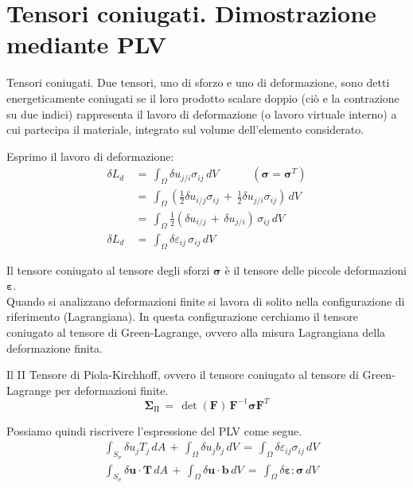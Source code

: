 \section{Tensori coniugati. Dimostrazione mediante PLV}

\begin{definizioneBox}
Tensori coniugati. Due tensori, uno di sforzo e uno di deformazione, sono detti energeticamente coniugati
se il loro prodotto scalare doppio (ciò e la contrazione su due indici) rappresenta il lavoro di
deformazione (o lavoro virtuale interno) a cui partecipa il materiale, integrato sul volume
dell'elemento considerato.
\end{definizioneBox}
Esprimo  il lavoro di deformazione:
\begin{align*}
    \delta L_d \, &=\,  \int_{\Omega} \delta u_{j/i}  \sigma_{ij}  \, dV  
      \quad\quad\quad \left( \boldsymbol{\sigma} = \boldsymbol{\sigma}^T \right)\\
    &= \,  \int_{\Omega}  \left( \frac{1}{2} \delta u_{i/j}  \sigma_{ij} \, + \,        \frac{1}{2} \delta u_{j/i}  \sigma_{ij} \right) \, dV  \\
    &=  \,  \int_{\Omega}  \frac{1}{2} \left( \delta u_{i/j}  \, + \,       \delta u_{j/i}  \right)\,\sigma_{ij}  \, dV  \\
     \delta L_d \, &= \,  \int_{\Omega}  \delta \varepsilon_{ij}  \,\sigma_{ij}  \, dV 
\end{align*}

Il tensore coniugato al tensore degli sforzi $\boldsymbol{\sigma}$ è il tensore delle piccole deformazioni $\boldsymbol{\varepsilon}$.\\

Quando si analizzano deformazioni finite si lavora di solito nella configurazione di riferimento (Lagrangiana). In questa configurazione cerchiamo il tensore coniugato al tensore di Green-Lagrange, ovvero alla misura Lagrangiana della deformazione finita. 

\begin{definizioneBox}
    Il II Tensore di Piola-Kirchhoff, ovvero il tensore coniugato al tensore di Green-Lagrange per deformazioni finite.
    \begin{equation*}
        \boldsymbol{\Sigma}_{\mathrm{II}} \,= \, \det (\boldsymbol{F} )\, \boldsymbol{F}^{-1} \boldsymbol{\sigma} \boldsymbol{F}^T
    \end{equation*}
\end{definizioneBox}

Possiamo quindi riscrivere l'espressione del PLV come segue.
\begin{align*}
     & \int_{S_{\sigma}}  \delta u_j T_j \, dA  \, +\,\int_{\Omega} \delta u_{j}  b_j  \, dV \, = \, \int_{\Omega} \delta \varepsilon_{ij}  \sigma_{ij}  \, dV   \\
    &  \int_{S_{\sigma}} \delta \mathbf{u} \cdot \mathbf{T} \, dA 
    \,+\, \int_{\Omega} \delta \mathbf{u} \cdot \mathbf{b} \, dV 
    \,=\, \int_{\Omega} \delta \boldsymbol{\varepsilon} : \boldsymbol{\sigma} \, dV
\end{align*}








